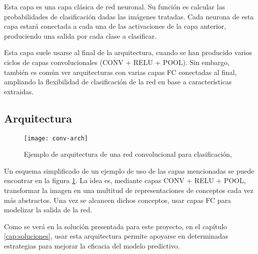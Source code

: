 Esta capa es una capa clásica de red neuronal. Su función es calcular las probabilidades de clasificación dadas las imágenes tratadas. Cada neurona de esta capa estará conectada a cada una de las activaciones de la capa anterior, produciendo una salida por cada clase a clasificar.

Esta capa suele usarse al final de la arquitectura, cuando se han producido varios ciclos de capas convolucionales (CONV + RELU + POOL). Sin embargo, también es común ver arquitecturas con varias capas FC conectadas al final, ampliando la flexibilidad de clasificación de la red en base a características extraidas.

\subsection{Arquitectura}
\label{sec:conv-net-arch}

\begin{figure}
    \centering
    \caption{Ejemplo de arquitectura de una red convolucional para clasificación, \parencite{clarifai}}
\label{conv-arch}
  \texttt{[image: conv-arch]}
\end{figure}

Un esquema simplificado de un ejemplo de uso de las capas mencionadas se puede encontrar en la figura \ref{conv-arch}. La idea es, mediante capas CONV + RELU + POOL, transformar la imagen en una multitud de representaciones de conceptos cada vez más abstractos. Una vez se alcancen dichos conceptos, usar capas FC para modelizar la salida de la red.

Como se verá en la solución presentada para este proyecto, en el capítulo \ref{cap:soluciones}, usar esta arquitectura permite apoyarse en determinadas estrategias para mejorar la eficacia del modelo predictivo.
